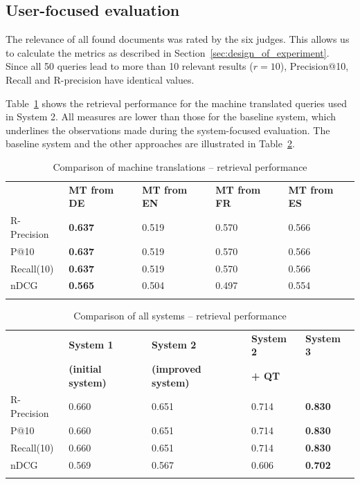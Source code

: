 \documentclass[a4paper,11pt]{article}
\begin{document}
\subsection{User-focused evaluation}
\label{results}
The relevance of all found documents was rated by the six judges. This allows us to calculate the metrics as described in Section~\ref{sec:design_of_experiment}. Since all 50 queries lead to more than 10 relevant results ($r = 10$), Precision@10, Recall and R-precision have identical values.

Table~\ref{tab:performance_mt_systems} shows the retrieval performance for the machine translated queries used in System 2. All measures are lower than those for the baseline system, which underlines the observations made during the system-focused evaluation. The baseline system and the other approaches are illustrated in Table~\ref{tab:performance_all_systems}.

\begin{table}[ht]
\centering
\begin{tabularx}{\textwidth}{lllll}
\toprule
\addlinespace
& \textbf{MT from DE} & \textbf{MT from EN} & \textbf{MT from FR} & \textbf{MT from ES} \\
\addlinespace
\cmidrule{1-5}
\addlinespace
R-Precision &  \textbf{0.637} & 0.519 & 0.570 & 0.566 \\
\addlinespace
P@10 & \textbf{0.637} & 0.519 & 0.570 & 0.566 \\
\addlinespace
Recall(10) & \textbf{0.637} & 0.519 & 0.570 & 0.566 \\
\addlinespace
nDCG & \textbf{0.565} & 0.504 & 0.497 & 0.554 \\
\addlinespace
\bottomrule
\end{tabularx}
\caption{Comparison of machine translations -- retrieval performance}
\label{tab:performance_mt_systems}
\end{table}

\begin{table}[ht]
\centering
\begin{tabularx}{\textwidth}{lllll}
\toprule
\addlinespace
& \textbf{System 1} & \textbf{System 2} & \textbf{System 2} & \textbf{System 3} \\
& \textbf{(initial system)} & \textbf{(improved system)} & \textbf{+ QT} & \\
\addlinespace
\cmidrule{1-5}
\addlinespace
R-Precision &  0.660 & 0.651 & 0.714 & \textbf{0.830} \\
\addlinespace
P@10 & 0.660 & 0.651 & 0.714 & \textbf{0.830} \\
\addlinespace
Recall(10) & 0.660 & 0.651 & 0.714 & \textbf{0.830} \\
\addlinespace
nDCG & 0.569 & 0.567 & 0.606 & \textbf{0.702} \\
\addlinespace
\bottomrule
\end{tabularx}
\caption{Comparison of all systems -- retrieval performance}
\label{tab:performance_all_systems}
\end{table}
\end{document}
